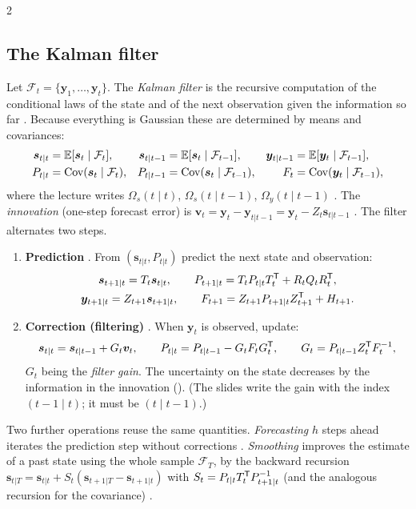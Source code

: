 \begin{paracol}{2}
\subsection{The Kalman filter}\label{ch09:sec-kalman}
Let $\mathcal F_t=\{\bm y_1,\dots,\bm y_t\}$. The \emph{Kalman filter} is the recursive computation of the conditional laws of the state and of the next observation given the information so far
. Because everything is Gaussian these are determined by means and covariances:
\begin{align*}
  \bm s_{t|t}&=\mathbb{E}[\bm s_t\mid\mathcal F_t], & \bm s_{t|t-1}&=\mathbb{E}[\bm s_t\mid\mathcal F_{t-1}], & \bm y_{t|t-1}&=\mathbb{E}[\bm y_t\mid\mathcal F_{t-1}],\\
  P_{t|t}&=\operatorname{Cov}(\bm s_t\mid\mathcal F_t), & P_{t|t-1}&=\operatorname{Cov}(\bm s_t\mid\mathcal F_{t-1}), & F_t&=\operatorname{Cov}(\bm y_t\mid\mathcal F_{t-1}),
\end{align*}
where the lecture writes $\Omega_s(t\mid t)$, $\Omega_s(t\mid t-1)$, $\Omega_y(t\mid t-1)$ . The \emph{innovation} (one-step forecast error) is
$\bm v_t=\bm y_t-\bm y_{t|t-1}=\bm y_t-Z_t\bm s_{t|t-1}$ . The filter alternates two steps.
\begin{enumerate}[1.]
  \item \textbf{Prediction} . From $(\bm s_{t|t},P_{t|t})$ predict the next state and observation:
        \begin{equation}\label{ch09:eq-kfpred}
          \begin{gathered}
          \bm s_{t+1|t}=T_t\bm s_{t|t},\qquad P_{t+1|t}=T_tP_{t|t}T_t^{\mathsf T}+R_tQ_tR_t^{\mathsf T},\\
          \bm y_{t+1|t}=Z_{t+1}\bm s_{t+1|t},\qquad F_{t+1}=Z_{t+1}P_{t+1|t}Z_{t+1}^{\mathsf T}+H_{t+1}.
          \end{gathered}
        \end{equation}
  \item \textbf{Correction (filtering)} . When $\bm y_t$ is observed, update:
        \begin{equation}\label{ch09:eq-kfupd}
          \bm s_{t|t}=\bm s_{t|t-1}+G_t\bm v_t,\qquad P_{t|t}=P_{t|t-1}-G_tF_tG_t^{\mathsf T},\qquad G_t=P_{t|t-1}Z_t^{\mathsf T} F_t^{-1},
        \end{equation}
        $G_t$ being the \emph{filter gain}. The uncertainty on the state decreases by the information in the innovation (). (The slides write the gain with the index
        $(t-1\mid t)$; it must be $(t\mid t-1)$.)
\end{enumerate}
Two further operations reuse the same quantities. \emph{Forecasting} $h$ steps ahead iterates the prediction step without corrections . \emph{Smoothing} improves the estimate of a past
state using the whole sample $\mathcal F_T$, by the backward recursion
$\bm s_{t|T}=\bm s_{t|t}+S_t(\bm s_{t+1|T}-\bm s_{t+1|t})$ with $S_t=P_{t|t}T_t^{\mathsf T} P_{t+1|t}^{-1}$ (and the analogous recursion for the covariance) .


\end{paracol}
